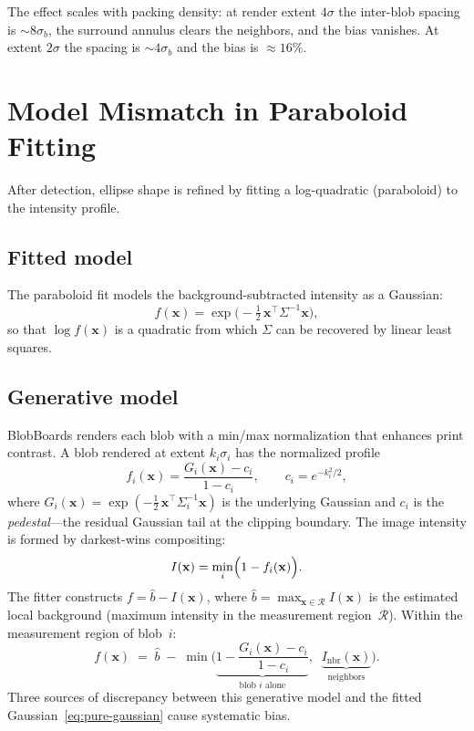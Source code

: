 \documentclass[11pt]{article}
\begin{document}
The effect scales with packing density: at render extent $4\sigma$ the
inter-blob spacing is $\sim\!8\sigma_b$, the surround annulus clears the
neighbors, and the bias vanishes.  At extent $2\sigma$ the spacing is
$\sim\!4\sigma_b$ and the bias is $\approx 16\%$.

\section{Model Mismatch in Paraboloid Fitting}

After detection, ellipse shape is refined by fitting a log-quadratic
(paraboloid) to the intensity profile.

\subsection{Fitted model}

The paraboloid fit models the background-subtracted intensity as a
Gaussian:
\begin{equation}
  f(\mathbf{x}) = \exp\!\bigl(-\tfrac{1}{2}\,\mathbf{x}^\top \Sigma^{-1} \mathbf{x}\bigr),
  \label{eq:pure-gaussian}
\end{equation}
so that $\log f(\mathbf{x})$ is a quadratic from which $\Sigma$ can be
recovered by linear least squares.

\subsection{Generative model}

BlobBoards renders each blob with a min/max normalization that enhances
print contrast.  A blob rendered at extent $k_i\sigma_i$ has the
normalized profile
\begin{equation}
  f_i(\mathbf{x})
    = \frac{G_i(\mathbf{x}) - c_i}{1 - c_i},
  \qquad
  c_i = e^{-k_i^2/2},
  \label{eq:pedestal-profile}
\end{equation}
where $G_i(\mathbf{x}) = \exp(-\tfrac{1}{2}\,\mathbf{x}^\top
\Sigma_i^{-1}\mathbf{x})$ is the underlying Gaussian and $c_i$ is the
\emph{pedestal}---the residual Gaussian tail at the clipping boundary.
The image intensity is formed by darkest-wins compositing:
\begin{equation}
  I(\mathbf{x}) = \min_i \Bigl(1 - f_i(\mathbf{x})\Bigr).
  \label{eq:compositing}
\end{equation}
The fitter constructs $f = \hat{b} - I(\mathbf{x})$, where
$\hat{b} = \max_{\mathbf{x} \in \mathcal{R}} I(\mathbf{x})$ is the
estimated local background (maximum intensity in the measurement
region~$\mathcal{R}$).  Within the measurement region of blob~$i$:
\begin{equation}
  f(\mathbf{x}) \;=\; \hat{b} \;-\; \min\!\biggl(
    \underbrace{1 - \frac{G_i(\mathbf{x}) - c_i}{1-c_i}}_{\text{blob }i\text{ alone}},
    \;\;
    \underbrace{I_{\mathrm{nbr}}(\mathbf{x})}_{\text{neighbors}}
  \biggr).
  \label{eq:observed-f}
\end{equation}
Three sources of discrepancy between this generative model and the
fitted Gaussian~\eqref{eq:pure-gaussian} cause systematic bias.
\end{document}
